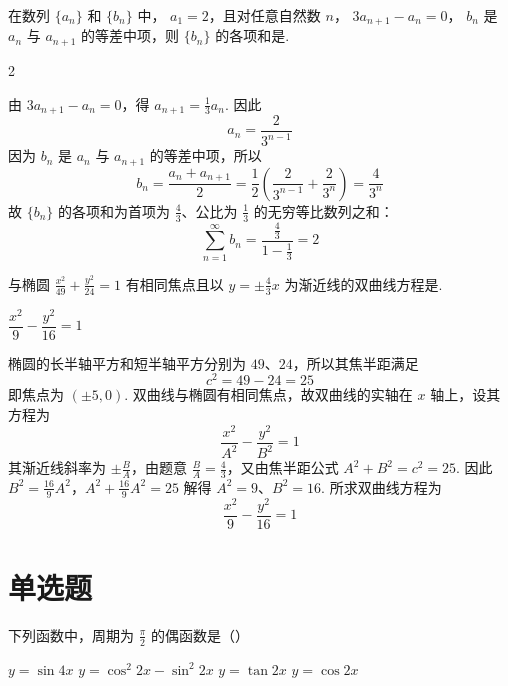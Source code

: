 \documentclass[UTF8,a4paper,oneside,11pt]{ctexbook}
\begin{document}
\begin{problem}
在数列 \(\{a_{n}\} \) 和 \(\{b_{n}\} \) 中， \(a_{1}=2 \)，且对任意自然数 \(n\)， \(3a_{n+1}-a_{n}=0 \)， \(b_{n} \) 是 \(a_{n} \) 与 \(a_{n+1} \) 的等差中项，则 \(\{b_{n}\} \) 的各项和是\fillinblank{}.
\end{problem}

\begin{answer}
2
\end{answer}

\begin{solution}
由 \(3a_{n+1}-a_n=0\)，得 \(a_{n+1}=\frac13a_n\). 因此
\[
a_n=\frac{2}{3^{n-1}}
\]
因为 \(b_n\) 是 \(a_n\) 与 \(a_{n+1}\) 的等差中项，所以
\[
b_n=\frac{a_n+a_{n+1}}2=\frac12\left(\frac{2}{3^{n-1}}+\frac{2}{3^n}\right)=\frac4{3^n}
\]
故 \(\{b_n\}\) 的各项和为首项为 \(\frac43\)、公比为 \(\frac13\) 的无穷等比数列之和：
\[
\sum_{n=1}^{\infty}b_n=\frac{\frac43}{1-\frac13}=2
\]
\end{solution}

\begin{problem}
与椭圆 \(\frac{x^2}{49} + \frac{y^2}{24} = 1\) 有相同焦点且以 \(y = \pm \frac{4}{3} x\) 为渐近线的双曲线方程是\fillinblank{}.
\end{problem}

\begin{answer}
\(\dfrac{x^2}{9}-\dfrac{y^2}{16}=1\)
\end{answer}

\begin{solution}
椭圆的长半轴平方和短半轴平方分别为 \(49\)、\(24\)，所以其焦半距满足
\[
c^2=49-24=25
\]
即焦点为 \((\pm5,0)\). 双曲线与椭圆有相同焦点，故双曲线的实轴在 \(x\) 轴上，设其方程为
\[
\frac{x^2}{A^2}-\frac{y^2}{B^2}=1
\]
其渐近线斜率为 \(\pm \frac{B}{A}\)，由题意 \(\frac{B}{A}=\frac{4}{3}\)，又由焦半距公式 \(A^2+B^2=c^2=25\). 因此
\(B^2=\frac{16}{9}A^2\)，\(A^2+\frac{16}{9}A^2=25\)
解得 \(A^2=9\)、\(B^2=16\). 所求双曲线方程为
\[
\frac{x^2}{9}-\frac{y^2}{16}=1
\]
\end{solution}

\section{单选题}

\begin{problem}
下列函数中，周期为 \(\frac{\pi}{2}\) 的偶函数是（\quad）

\choices
    {\(y = \sin 4x \)}
    {\(y = \cos^2 2x - \sin^2 2x \)}
    {\(y = \tan 2x \)}
    {\(y = \cos 2x \)}
\end{problem}
\end{document}
